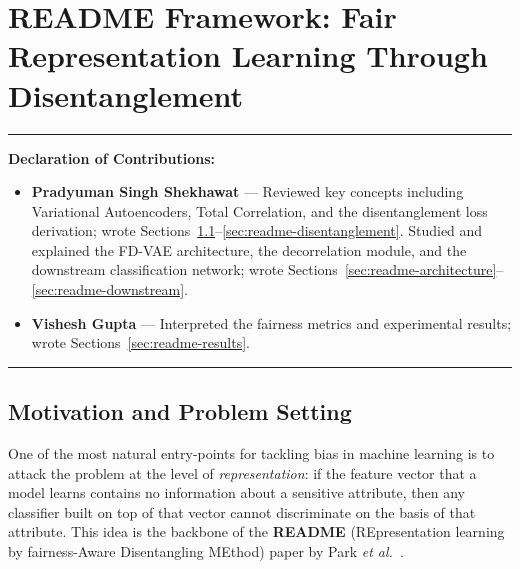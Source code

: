 \setlength{\headheight}{14.5pt}
\addtolength{\topmargin}{-2.5pt}

\chapter{README Framework: Fair Representation Learning Through Disentanglement}
\label{ch:readme}



\vspace{0.5em}
\noindent\rule{\textwidth}{0.4pt}
\textbf{Declaration of Contributions:}
\begin{itemize}[leftmargin=*,noitemsep]
\item \textbf{Pradyuman Singh Shekhawat} — Reviewed key concepts including Variational Autoencoders,
      Total Correlation, and the disentanglement loss derivation; wrote
      Sections~\ref{sec:readme-motivation}--\ref{sec:readme-disentanglement}. Studied and explained the FD-VAE architecture,
      the decorrelation module, and the downstream classification network;
      wrote Sections~\ref{sec:readme-architecture}--\ref{sec:readme-downstream}.
\item \textbf{Vishesh Gupta} — Interpreted the fairness metrics and experimental results;
      wrote Sections~\ref{sec:readme-results}.
\end{itemize}
\noindent\rule{\textwidth}{0.4pt}
\vspace{1em}

\section{Motivation and Problem Setting}
\label{sec:readme-motivation}

One of the most natural entry-points for tackling bias in machine learning is to attack the problem at
the level of \emph{representation}: if the feature vector that a model learns contains no information
about a sensitive attribute, then any classifier built on top of that vector cannot discriminate on
the basis of that attribute. This idea is the backbone of the \textbf{README} (REpresentation learning
by fairness-Aware Disentangling MEthod) paper by Park \emph{et al.}~\cite{park2020readme}.

